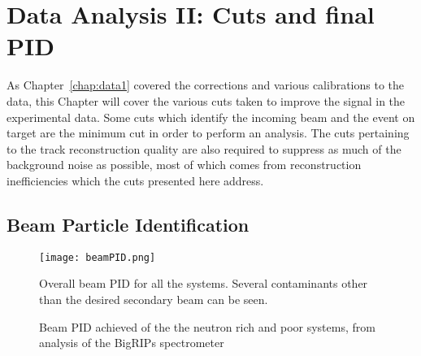 \chapter{Data Analysis II: Cuts and final PID}
\label{chap:data2}

As Chapter~\ref{chap:data1} covered the corrections and various calibrations to the data, this Chapter will cover the various cuts taken to improve the signal in the experimental data. Some cuts which identify the incoming beam and the event on target are the minimum cut in order to perform an analysis. The cuts pertaining to the track reconstruction quality are also required to suppress as much of the background noise as possible, most of which comes from reconstruction inefficiencies which the cuts presented here address. 



\section{Beam Particle Identification}
\label{sec:beam}

\begin{figure}[!htb]
\centering
\texttt{[image: beamPID.png]}
\caption{Overall beam PID for all the systems. Several contaminants other than the desired secondary beam can be seen.}
\label{fig:beampid}
\end{figure}


\begin{figure}[!htb]%
    \centering
    \qquad

	\caption{Beam PID achieved of the the neutron rich and poor systems, from analysis of the BigRIPs spectrometer \cite{jon} }
	\label{fig:beampidTwo}
\end{figure}


